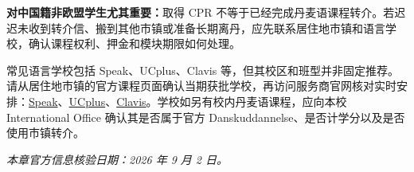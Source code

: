 \begin{grayleftbox}
\textbf{对中国籍非欧盟学生尤其重要：}取得 CPR 不等于已经完成丹麦语课程转介。若迟迟未收到转介信、搬到其他市镇或准备长期离丹，应先联系居住地市镇和语言学校，确认课程权利、押金和模块期限如何处理。
\end{grayleftbox}

常见语言学校包括 Speak、UCplus、Clavis 等，但其校区和班型并非固定推荐。请从居住地市镇的官方课程页面确认当期获批学校，再访问服务商官网核对实时安排：\href{https://speakspeak.dk}{Speak}、\href{https://ucplus.dk}{UCplus}、\href{https://clavis.org}{Clavis}。学校如另有校内丹麦语课程，应向本校 International Office 确认其是否属于官方 Danskuddannelse、是否计学分以及是否使用市镇转介。

\noindent\textit{本章官方信息核验日期：2026 年 9 月 2 日。}
